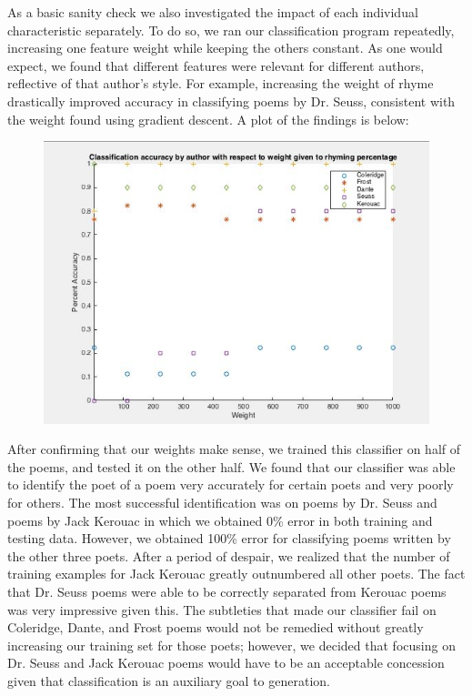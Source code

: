 \documentclass[journal]{IEEEtran}
\begin{document}
As a basic sanity check we also investigated the impact of each individual characteristic separately. To do so, we ran our classification program repeatedly, increasing one feature weight while keeping the others constant. As one would expect, we found that different features were relevant for different authors, reflective of that author’s style. For example, increasing the weight of rhyme drastically improved accuracy in classifying poems by Dr. Seuss, consistent with the weight found using gradient descent. A plot of the findings is below:
\begin{figure}[H]
    \centering
    \includegraphics[width=0.8\columnwidth]{class}
\end{figure}

After confirming that our weights make sense, we trained this classifier on half of the poems, and tested it on the other half. We found that our classifier was able to identify the poet of a poem very accurately for certain poets and very poorly for others. The most successful identification was on poems by Dr. Seuss and poems by Jack Kerouac in which we obtained 0\% error in both training and testing data. However, we obtained 100\% error for classifying poems written by the other three poets. After a period of despair, we realized that the number of training examples for Jack Kerouac greatly outnumbered all other poets. The fact that Dr. Seuss poems were able to be correctly separated from Kerouac poems was very impressive given this. The subtleties that made our classifier fail on Coleridge, Dante, and Frost poems would not be remedied without greatly increasing our training set for those poets; however, we decided that focusing on Dr. Seuss and Jack Kerouac poems would have to be an acceptable concession given that classification is an auxiliary goal to generation. 
\end{document}
